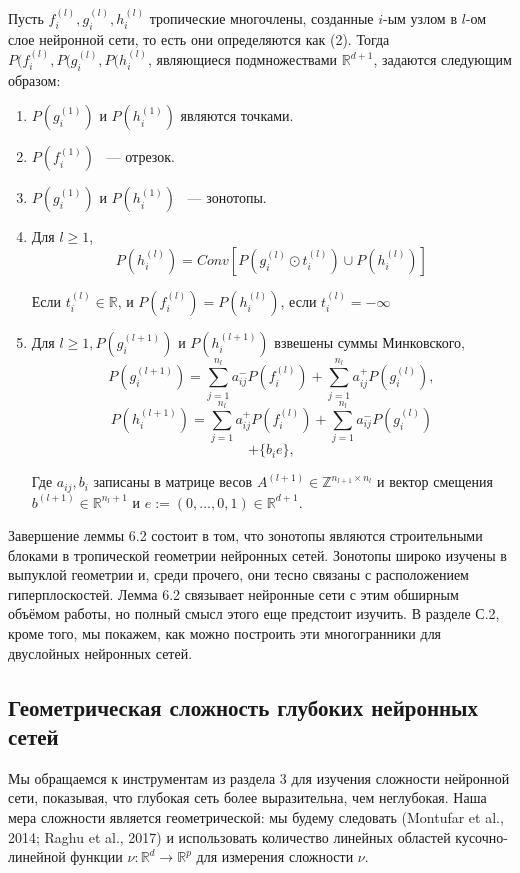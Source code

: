 \documentclass[russian]{lecture-notes}
\begin{document}
	\begin{Lemma}
		Пусть $f_i^{(l)},g_i^{(l)},h_i^{(l)}$ тропические многочлены, созданные $i$-ым узлом в $l$-ом слое нейронной сети, то есть они определяются как (2). Тогда $P(f_i^{(l)}, P(g_i^{(l)},P(h_i^{(l)}$, являющиеся подмножествами $\mathbb{R}^{d+1}$, задаются следующим образом:
		\begin{enumerate}
			\item $P(g_i^{(1)}) \text{ и } P(h_i^{(1)})$ являются точками.
			\item $P(f_i^{(1)})$ ~--- отрезок.
			\item $P(g_i^{(1)}) \text{ и } P(h_i^{(1)})$ ~--- зонотопы.
			\item Для $l \geq 1$,
			\[
				P(h_i^{(l)}) = Conv[P(g_i^{(l)}\odot t_i^{(l)}) \cup P(h_i^{(l)})]
			\]
			
			Если $t_i^{(l)} \in \mathbb{R}$, и $P(f_i^{(l)}) = P(h_i^{(l)})$, если $t_i^{(l)} = -\infty$
			\item Для $l \geq  1, P(g_i^{(l+1)})\text{ и } P(h_i^{(l+1)}) $ взвешены суммы Минковского, 
			\[
				P(g_i^{(l+1)}) = \sum\limits_{j=1}^{n_l} a_{ij}^-P(f_i^{(l)}) + \sum\limits_{j=1}^{n_l} a_{ij}^+P(g_i^{(l)}),
			\]
			\[
			P(h_i^{(l+1)}) = \sum\limits_{j=1}^{n_l} a_{ij}^+P(f_i^{(l)}) + \sum\limits_{j=1}^{n_l} a_{ij}^-P(g_i^{(l)})
			\]
			\[
				+\{b_ie\},
			\]
			
			Где $a_{ij}, b_i$ записаны в матрице весов $A^(l+1) \in \mathbb{Z}^{n_{l+1}\times n_l}$ и вектор смещения $b^(l+1) \in \mathbb{R}^{n_l+1} \text{ и } e:= (0, \dots,0,1)\in \mathbb{R}^{d+1}$.			
		\end{enumerate}
		\end{Lemma}
		Завершение леммы 6.2 состоит в том, что зонотопы являются строительными блоками в тропической геометрии нейронных сетей. Зонотопы широко изучены в выпуклой геометрии и, среди прочего, они тесно связаны с расположением гиперплоскостей. Лемма 6.2 связывает нейронные сети с этим обширным объёмом работы, но полный смысл этого еще предстоит изучить. В разделе С.2, кроме того, мы покажем, как можно построить эти многогранники для двуслойных нейронных сетей.
		
		\subsection{Геометрическая сложность глубоких нейронных сетей}
		
		Мы обращаемся к инструментам из раздела 3 для изучения сложности нейронной сети, показывая, что глубокая сеть более выразительна, чем неглубокая. Наша мера сложности является геометрической: мы будему следовать (Montufar et al., 2014;
		Raghu et al., 2017) и использовать количество линейных областей кусочно-линейной функции $\nu : \mathbb{R}^d \rightarrow \mathbb{R}^p$ для измерения сложности $\nu$.
		
\end{document}
